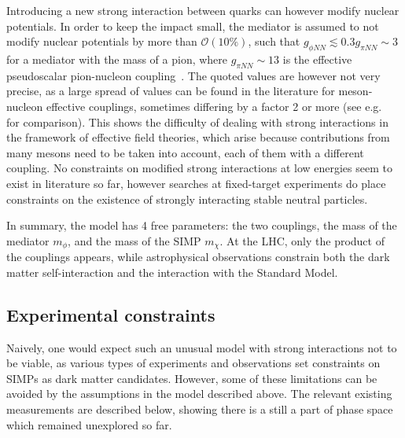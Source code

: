 Introducing a new strong interaction between quarks can however modify nuclear potentials. In order to keep the impact small, the mediator is assumed to not modify nuclear potentials by more than $\mathcal{O}(10\%)$, such that $g_{\phi NN} \lesssim 0.3g_{\pi NN}\sim 3$ for a mediator with the mass of a pion, where $g_{\pi NN} \sim 13$ is the effective pseudoscalar pion-nucleon coupling~\cite{Donoghue:1992dd}. The quoted values are however not very precise, as a large spread of values can be found in the literature for meson-nucleon effective couplings, sometimes differing by a factor 2 or more (see e.g.~\cite{Downum:2006re} for comparison). This shows the difficulty of dealing with strong interactions in the framework of effective field theories, which arise because contributions from many mesons need to be taken into account, each of them with a different coupling. No constraints on modified strong interactions at low energies seem to exist in literature so far, however searches at fixed-target experiments do place constraints on the existence of strongly interacting stable neutral particles.

In summary, the model has 4 free parameters: the two couplings, the mass of the mediator $m_{\phi}$, and the mass of the \ac{SIMP} $m_{\chi}$. At the \ac{LHC}, only the product of the couplings appears, while astrophysical observations constrain both the dark matter self-interaction and the interaction with the Standard Model.

\subsection{Experimental constraints}
\label{sec:SIMP_constraints}

Naively, one would expect such an unusual model with strong interactions not to be viable, as various types of experiments and observations set constraints on \acp{SIMP} as dark matter candidates. However, some of these limitations can be avoided by the assumptions in the model described above. The relevant existing measurements are described below, showing there is a still a part of phase space which remained unexplored so far.

